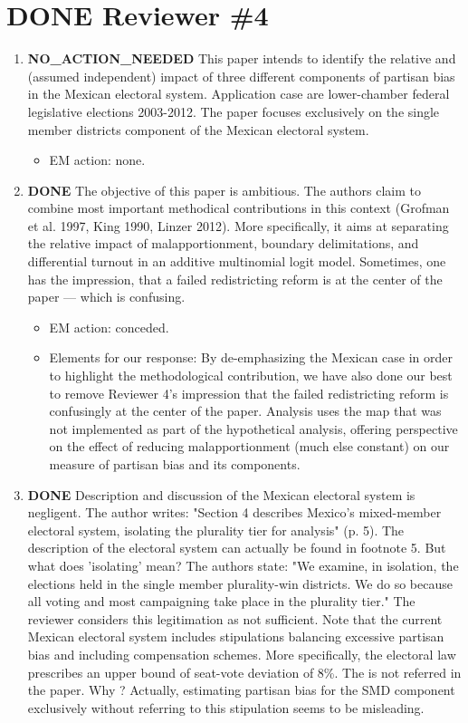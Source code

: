 \documentclass{article}
\begin{document}
\section{{\bfseries\sffamily DONE} Reviewer \#4}
\label{sec:orgheadline31}
\begin{enumerate}
\item {\bfseries\sffamily NO\_ACTION\_NEEDED} This paper intends to identify the relative and (assumed independent) impact of three different components of partisan bias  in the Mexican electoral system. Application case are lower-chamber federal legislative elections 2003-2012. The paper focuses exclusively on the single member districts  component of the Mexican electoral system.
\label{sec:orgheadline21}
\begin{itemize}
\item EM action: none.
\end{itemize}
\item {\bfseries\sffamily DONE} The objective of this paper is ambitious. The authors claim to combine most important methodical contributions in this context (Grofman et al. 1997, King 1990, Linzer 2012).  More specifically, it aims at separating the relative impact of malapportionment, boundary delimitations, and differential turnout in an additive multinomial logit model. Sometimes, one has the impression, that a failed redistricting reform is at the center of the paper --- which is confusing.
\label{sec:orgheadline22}
\begin{itemize}
\item EM action: conceded.
\item Elements for our response: By de-emphasizing the Mexican case in order to highlight the methodological contribution, we have also done our best to remove Reviewer 4's impression that the failed redistricting reform is confusingly at the center of the paper. Analysis uses the map that was not implemented as part of the hypothetical analysis, offering perspective on the effect of reducing malapportionment (much else constant) on our measure of partisan bias and its components.
\end{itemize}
\item {\bfseries\sffamily DONE} Description and discussion of the Mexican electoral system is negligent. The author writes: "Section 4 describes Mexico's mixed-member electoral system, isolating the plurality tier for analysis" (p. 5). The description of the electoral system can actually be found in footnote 5. But  what does 'isolating' mean? The authors state: "We examine, in isolation, the elections held in the single member plurality-win districts. We do so because all voting and most campaigning take place in the plurality tier." The reviewer considers this legitimation as not sufficient. Note that the current Mexican electoral system includes stipulations balancing excessive partisan bias and including compensation schemes. More specifically, the electoral law prescribes an upper bound of seat-vote deviation of 8\%. The is not referred in the paper. Why ? Actually, estimating partisan bias for the SMD component exclusively without referring to this stipulation seems to be misleading.

\end{enumerate}
\end{document}
